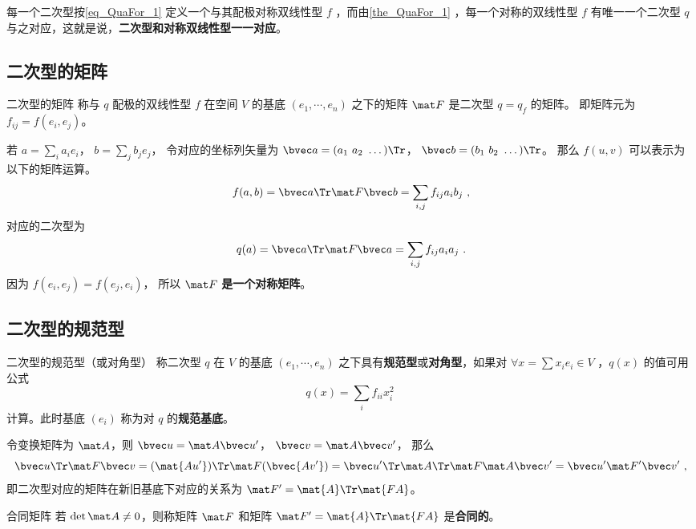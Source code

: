 每一个二次型按\autoref{eq_QuaFor_1} 定义一个与其配极对称双线性型 $f$ ，而由\autoref{the_QuaFor_1} ，每一个对称的双线性型 $f$ 有唯一一个二次型 $q$ 与之对应，这就是说，\textbf{二次型和对称双线性型一一对应}。

\subsection{二次型的矩阵}
\begin{definition}{二次型的矩阵}
称与 $q$ 配极的双线性型 $f$ 在空间 $V$ 的基底 $(e_1,\cdots,e_n)$ 之下的矩阵 $\mat F$ 是二次型 $q=q_f$ 的矩阵。 即矩阵元为 $f_{ij} = f(e_i, e_j)$。
\end{definition}

若 $a = \sum_i a_i e_i$， $b = \sum_j b_j e_j$， 令对应的坐标列矢量为 $\bvec a = (a_1\ a_2\ \dots)\Tr$， $\bvec b = (b_1\ b_2\ \dots)\Tr$。 那么 $f(u, v)$ 可以表示为以下的矩阵运算。
\begin{equation}
f(a, b) = \bvec a\Tr \mat F \bvec b = \sum_{i,j} f_{ij}a_i b_j~,
\end{equation}
对应的二次型为
\begin{equation}
q(a) = \bvec a\Tr \mat F \bvec a = \sum_{i,j} f_{ij}a_i a_j~.
\end{equation}
因为 $f(e_i, e_j) = f(e_j, e_i)$， 所以 $\mat F$ \textbf{是一个对称矩阵}。

\subsection{二次型的规范型}
\begin{definition}{二次型的规范型（或对角型）}\label{def_QuaFor_1}
称二次型 $q$ 在 $V$ 的基底 $(e_1,\cdots,e_n)$ 之下具有\textbf{规范型}或\textbf{对角型}，如果对 $\forall x=\sum x_i e_i\in V$ ，$q(x)$ 的值可用公式
\begin{equation}
q(x)=\sum_{i}f_{ii}x_i^2~
\end{equation}
计算。此时基底 $(e_i)$ 称为对 $q$ 的\textbf{规范基底}。
\end{definition}

令变换矩阵为 $\mat A$，则 $\bvec u = \mat A \bvec u'$， $\bvec v = \mat A \bvec v'$， 那么
\begin{equation}
\bvec u\Tr \mat F \bvec v = (\mat {Au'})\Tr \mat F (\bvec {Av'}) = {\bvec u'}\Tr \mat A\Tr\mat F \mat A \bvec v'=\bvec u'\mat F' \bvec v'~,
\end{equation}
即二次型对应的矩阵在新旧基底下对应的关系为 $\mat F'=\mat{A}\Tr \mat{FA}$。
\begin{definition}{合同矩阵}
若 $\det \mat A\neq 0$，则称矩阵 $\mat F$ 和矩阵 $\mat F'=\mat{A}\Tr \mat{FA}$ 是\textbf{合同的}。
\end{definition}
